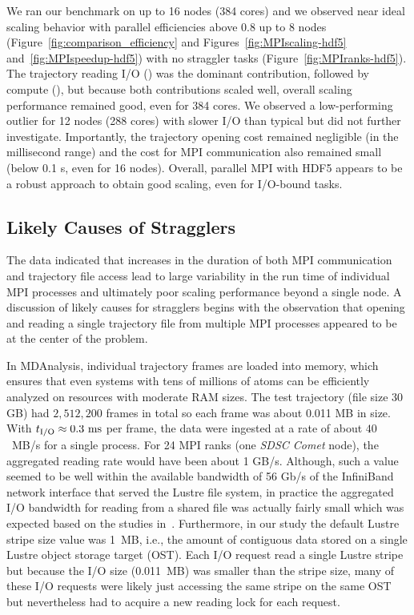 We ran our benchmark on up to 16 nodes (384 cores) and we observed near ideal scaling behavior with parallel efficiencies above 0.8 up to 8 nodes (Figure~\ref{fig:comparison_efficiency} and Figures~\ref{fig:MPIscaling-hdf5} and~\ref{fig:MPIspeedup-hdf5}) with no straggler tasks (Figure~\ref{fig:MPIranks-hdf5}).
The trajectory reading I/O (\tIO) was the dominant contribution, followed by compute (\tcomp), but because both contributions scaled well, overall scaling performance remained good, even for 384 cores.
We observed a low-performing outlier for 12 nodes (288 cores) with slower I/O than typical but did not further investigate.
Importantly, the trajectory opening cost remained negligible (in the millisecond range) and the cost for MPI communication also remained small (below 0.1 s, even for 16 nodes).
Overall, parallel MPI with HDF5 appears to be a robust approach to obtain good scaling, even for I/O-bound tasks.


\subsection{Likely Causes of Stragglers}
\label{sec:likelycauses}

The data indicated that increases in the duration of both MPI communication and trajectory file access lead to large variability in the run time of individual MPI processes and ultimately poor scaling performance beyond a single node.
A discussion of likely causes for stragglers begins with the observation that opening and reading a single trajectory file from multiple MPI processes appeared to be at the center of the problem. 

In MDAnalysis, individual trajectory frames are loaded into memory, which ensures that even systems with tens of millions of atoms can be efficiently analyzed on resources with moderate RAM sizes.
The test trajectory (file size 30 GB) had $2,512,200$ frames in total so each frame was about 0.011 MB in size.
With ${t}_{\text{I/O}} \approx 0.3~\text{ms}$ per frame, the data were ingested at a rate of about $40$~MB/s for a single process.
For 24 MPI ranks (one \emph{SDSC Comet} node), the aggregated reading rate would have been about 1 GB/s.
Although, such a value seemed to be well within the available bandwidth of 56 Gb/s of the InfiniBand network interface that served the Lustre file system, in practice the aggregated I/O bandwidth for reading from a shared file was actually fairly small which was expected based on the studies in~\cite{ATPESC2016}.
Furthermore, in our study the default Lustre stripe size value was 1~MB, i.e., the amount of contiguous data stored on a single Lustre object storage target (OST).
Each I/O request read a single Lustre stripe but because the I/O size (0.011~MB) was smaller than the stripe size, many of these I/O requests were likely just accessing the same stripe on the same OST but nevertheless had to acquire a new reading lock for each request.

